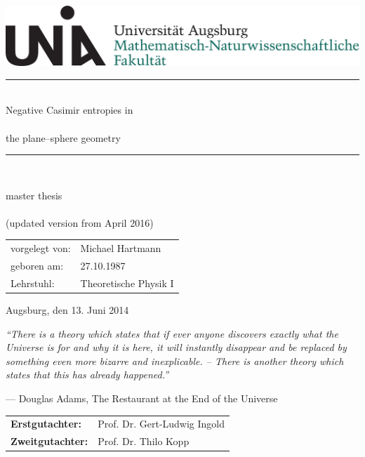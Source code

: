 \thispagestyle{empty}
\begin{center}
\includegraphics[scale=0.3]{UniAugLogoMNF.pdf}

\vfill

\rule{\textwidth}{0.7pt} \\
\vspace*{8mm}
{\Huge Negative Casimir entropies in}\\ \ \\
{\Huge the plane--sphere geometry} \\
\vspace*{5mm}
\rule{\textwidth}{0.7pt} \\

\vfill

{\huge master thesis} \\ \ \\
{(\large updated version from April 2016)} \\

\vfill

\begin{tabular}{ll}
vorgelegt von:  & Michael Hartmann \\
geboren am:     & 27.10.1987 \\
Lehrstuhl:      & Theoretische Physik I
\end{tabular}

\vfill

Augsburg, den 13. Juni 2014

\end{center}


\newpage
\thispagestyle{empty}
\vspace*{4cm}
\begin{center}
\textit{
``There is a theory which states that if ever anyone discovers exactly what the
Universe is for and why it is here, it will instantly disappear and be replaced
by something even more bizarre and inexplicable. -- There is another theory
which states that this has already happened.''} \\
\end{center}
\begin{flushright}
--- Douglas Adams, The Restaurant at the End of the Universe
\end{flushright}

\vspace*{12cm}

\begin{tabular}{ll}
\textbf{Erstgutachter:}  & Prof. Dr. Gert-Ludwig Ingold \\
\textbf{Zweitgutachter:} & Prof. Dr. Thilo Kopp
\end{tabular}
\newpage
